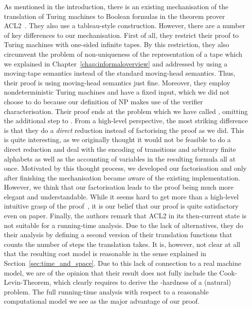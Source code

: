As mentioned in the introduction, there is an existing mechanisation of the translation of Turing machines to Boolean formulas in the theorem prover ACL2~\cite{gamboa:cook}. They also use a tableau-style construction. However, there are a number of key differences to our mechanisation.
First of all, they restrict their proof to Turing machines with one-sided infinite tapes. By this restriction, they also circumvent the problem of non-uniqueness of the representation of a tape which we explained in Chapter~\ref{chap:informaloverview} and addressed by using a moving-tape semantics instead of the standard moving-head semantics. Thus, their proof is using moving-head semantics just fine.
Moreover, they employ nondeterministic Turing machines and have a fixed input, which we did not choose to do because our definition of NP makes use of the verifier characterisation. Their proof ends at the problem which we have called \fsat{}, omitting the additional step to \sat{}.
From a high-level perspective, the most striking difference is that they do a \emph{direct} reduction instead of factorising the proof as we did. This is quite interesting, as we originally thought it would not be feasible to do a direct reduction and deal with the encoding of transitions and arbitrary finite alphabets as well as the accounting of variables in the resulting formula all at once. Motivated by this thought process, we developed our factorisation and only after finishing the mechanisation became aware of the existing implementation.
However, we think that our factorisation leads to the proof being much more elegant and understandable. While it seems hard to get more than a high-level intuitive grasp of the proof~\cite{gamboa:cook}, it is our belief that our proof is quite satisfactory even on paper.
Finally, the authors remark that ACL2 in its then-current state is not suitable for a running-time analysis. Due to the lack of alternatives, they do their analysis by defining a second version of their translation functions that counts the number of steps the translation takes. It is, however, not clear at all that the resulting cost model is reasonable in the sense explained in Section~\ref{sec:time_and_space}.
Due to this lack of connection to a real machine model, we are of the opinion that their result does not fully include the Cook-Levin-Theorem, which clearly requires to derive the \NP{}-hardness of a (natural) problem.
The full running-time analysis with respect to a reasonable computational model we see as the major advantage of our proof.

